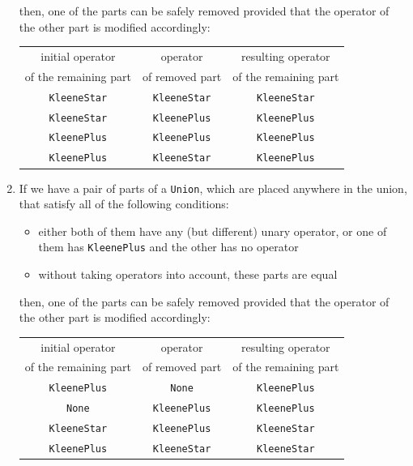 \documentclass{article}
\begin{document}
\begin{enumerate}
\begin{itemize}
  \end{itemize}

  then, one of the parts can be safely removed provided that the operator of the other part is
  modified accordingly:

  \noindent
  \begin{tabular}{c|c|c}
  initial operator & operator & resulting operator \\
  of the remaining part & of removed part & of the remaining part \\ \hline
  \verb|KleeneStar| & \verb|KleeneStar| & \verb|KleeneStar| \\
  \verb|KleeneStar| & \verb|KleenePlus| & \verb|KleenePlus| \\
  \verb|KleenePlus| & \verb|KleenePlus| & \verb|KleenePlus| \\
  \verb|KleenePlus| & \verb|KleeneStar| & \verb|KleenePlus| \\
  \end{tabular}
  

  \item If we have a pair of parts of a \verb|Union|, which are placed anywhere in the union, that
  satisfy all of the following conditions:

  \begin{itemize}

    \item either both of them have any (but different) unary operator, or one of them has
    \verb|KleenePlus| and the other has no operator

    \item without taking operators into account, these parts are equal

  \end{itemize}

  then, one of the parts can be safely removed provided that the operator of the other part is
  modified accordingly:

  \noindent
  \begin{tabular}{c|c|c}
  initial operator & operator & resulting operator \\
  of the remaining part & of removed part & of the remaining part \\ \hline
  \verb|KleenePlus| & \verb|None| & \verb|KleenePlus| \\
  \verb|None| & \verb|KleenePlus| & \verb|KleenePlus| \\
  \verb|KleeneStar| & \verb|KleenePlus| & \verb|KleeneStar| \\
  \verb|KleenePlus| & \verb|KleeneStar| & \verb|KleeneStar| \\
  \end{tabular}
  

\end{enumerate}
\end{document}
